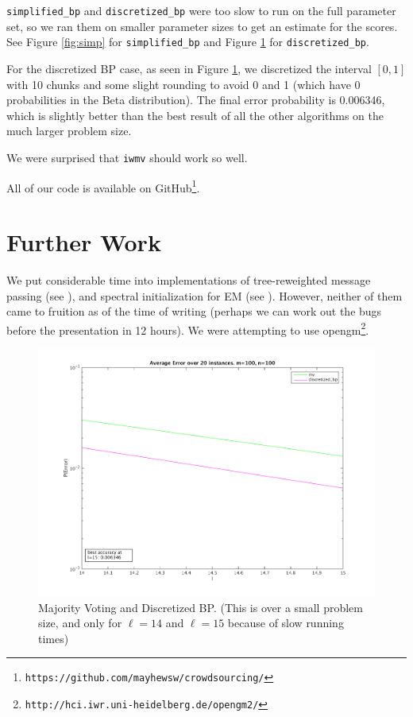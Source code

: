 \documentclass[11pt]{article}
\begin{document}
\texttt{simplified\_bp} and \texttt{discretized\_bp} were too slow to run on the full parameter set, so we ran them on smaller parameter sizes to get an estimate for the scores. See Figure \ref{fig:simp} for \texttt{simplified\_bp} and Figure \ref{fig:disc} for \texttt{discretized\_bp}.

For the discretized BP case, as seen in Figure \ref{fig:disc}, we discretized the interval $[0,1]$ with 10 chunks and some slight rounding to avoid 0 and 1 (which have 0 probabilities in the Beta distribution). The final error probability is 0.006346, which is slightly better than the best result of all the other algorithms on the much larger problem size. 

We were surprised that \texttt{iwmv} should work so well. 

All of our code is available on GitHub\footnote{\texttt{https://github.com/mayhewsw/crowdsourcing/}}.

\section{Further Work}
We put considerable time into implementations of tree-reweighted message passing (see \cite{kolmogorov2006convergent}), and spectral initialization for EM (see \cite{zhang2014spectral}). However, neither of them came to fruition as of the time of writing (perhaps we can work out the bugs before the presentation in 12 hours). We were attempting to use opengm\footnote{\texttt{http://hci.iwr.uni-heidelberg.de/opengm2/}}.




\begin{figure}[t]
\centering
\includegraphics[scale=0.5]{mv_discretized.png}
\caption{Majority Voting and Discretized BP. (This is over a small problem size, and only for $\ell=14$ and $\ell=15$ because of slow running times)}
\label{fig:disc}
\end{figure}
\end{document}
